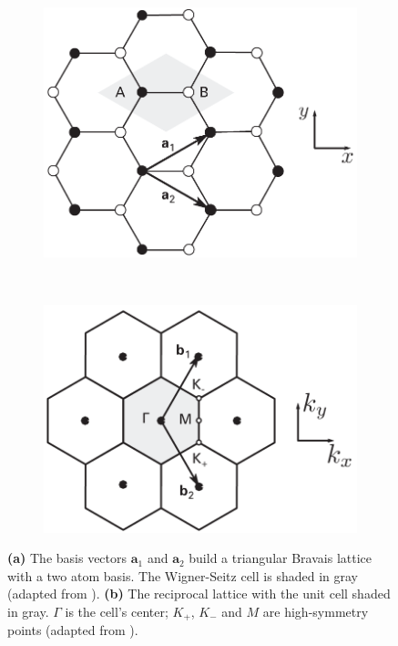 \begin{figure}[!h]
  \centering
  \begin{subfigure}[t]{0.45\textwidth}
    \caption{}
    \includegraphics[width=\textwidth]{./images/cell.png}
  \end{subfigure}
  ~
  \begin{subfigure}[t]{0.45\textwidth}
    \caption{}
    \includegraphics[width=\textwidth]{./images/k-cell.png}
  \end{subfigure}
  \caption{\textbf{(a)} The basis vectors $\mathbf{a}_1$ and $\mathbf{a}_2$ build a triangular Bravais lattice with a two atom basis. The Wigner-Seitz cell is shaded in gray (adapted from \cite{maffucci2014}). \textbf{(b)} The reciprocal lattice with the unit cell shaded in gray. $\Gamma$ is the cell's center; $K_+$, $K_-$ and $M$ are high-symmetry points (adapted from \cite{maffucci2014}).}
  \label{fig:lattice}
\end{figure}


